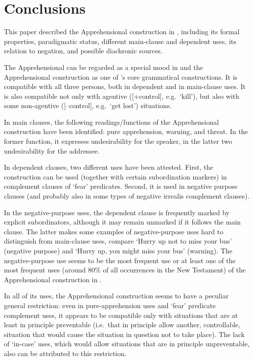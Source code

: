 \documentclass[output=paper,colorlinks,citecolor=brown]{langscibook}
\begin{document}
\section{Conclusions}
\label{sec:fedotov:conclusions}

This paper described the Apprehensional construction in , including its formal properties, paradigmatic status, different main-clause and dependent uses, its relation to negation, and possible diachronic sources.

The Apprehensional can be regarded as a special mood in  and the Apprehensional construction as one of 's core grammatical constructions. It is compatible with all three persons, both in dependent and in main-clause uses. It is also compatible not only with agentive ([+control], e.g.\ `kill'), but also with some non-agentive ([–control], e.g.\ `get lost') situations.

In main clauses, the following readings\slash functions of the Apprehensional construction have been identified: pure apprehension, warning, and threat. In the former function, it expresses undesirability for the speaker, in the latter two undesirability for the addressee.

In dependent clauses, two different uses have been attested. First, the construction can be used (together with certain subordination markers) in complement clauses of `fear' predicates. Second, it is used in negative purpose clauses (and probably also in some types of negative irrealis complement clauses).

In the negative-purpose uses, the dependent clause is frequently marked by explicit subordinators, although it may remain unmarked if it follows the main clause. The latter makes some examples of negative-purpose uses hard to distinguish from main-clause uses, compare `Hurry up not to miss your bus' (negative purpose) and `Hurry up, you might miss your bus' (warning). The negative-purpose use seems to be the most frequent use or at least one of the most frequent uses (around 80\% of all occurrences in the New Testament) of the Apprehensional construction in .

In all of its uses, the Apprehensional construction seems to have a peculiar general restriction: even in pure-apprehension uses and `fear' predicate complement uses, it appears to be compatible only with situations that are at least in principle preventable (i.e.\ that in principle allow another, controllable, situation that would cause the situation in question not to take place). The lack of `in-case' uses, which would allow situations that are in principle unpreventable, also can be attributed to this restriction.
\end{document}
